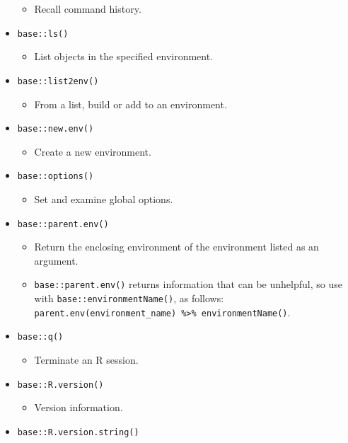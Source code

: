 \documentclass[
]{book}
\providecommand{\tightlist}{%
  \setlength{\itemsep}{0pt}\setlength{\parskip}{0pt}}
\begin{document}
\begin{itemize}
  \begin{itemize}
  \tightlist
  \item
    Recall command history.
  \end{itemize}
\item
  \texttt{base::ls()}

  \begin{itemize}
  \tightlist
  \item
    List objects in the specified environment.
  \end{itemize}
\item
  \texttt{base::list2env()}

  \begin{itemize}
  \tightlist
  \item
    From a list, build or add to an environment.
  \end{itemize}
\item
  \texttt{base::new.env()}

  \begin{itemize}
  \tightlist
  \item
    Create a new environment.
  \end{itemize}
\item
  \texttt{base::options()}

  \begin{itemize}
  \tightlist
  \item
    Set and examine global options.
  \end{itemize}
\item
  \texttt{base::parent.env()}

  \begin{itemize}
  \tightlist
  \item
    Return the enclosing environment of the environment listed as an argument.
  \item
    \texttt{base::parent.env()} returns information that can be unhelpful, so use with \texttt{base::environmentName()}, as follows: \texttt{parent.env(environment\_name)\ \%\textgreater{}\%\ environmentName()}.
  \end{itemize}
\item
  \texttt{base::q()}

  \begin{itemize}
  \tightlist
  \item
    Terminate an R session.
  \end{itemize}
\item
  \texttt{base::R.version()}

  \begin{itemize}
  \tightlist
  \item
    Version information.
  \end{itemize}
\item
  \texttt{base::R.version.string()}


\end{itemize}
\end{document}
